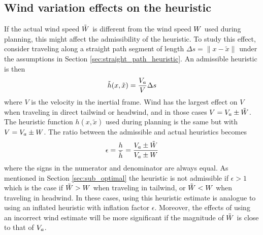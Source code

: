 \subsection{Wind variation effects on the heuristic}
If the actual wind speed $\tilde{W}$ is different from the wind speed $W$ used during planning, this 
might affect the admissibility of the heuristic. 
To study this effect, consider traveling along a straight path segment of length $\Delta s=\|x-\tilde{x}\|$ under the assumptions in Section \ref{sec:straight_path_heuristic}. 
An admissible heuristic is then 
\begin{equation}
    \tilde{h}(x, \tilde{x})=\frac{V_a}{V}\Delta s
\end{equation}
where $V$ is the velocity in the inertial frame. Wind has the largest effect on $V$ when traveling in direct tailwind or headwind, and in those cases $V=V_a\pm \tilde{W}$. The 
heuristic function $h(x, \tilde{x})$ used during planning is the same but with $V=V_a\pm W$. The ratio between the admissible and actual heuristics becomes
\begin{equation}\label{eq:wind_heuristic_eps}
    \epsilon = \frac{h}{\tilde{h}} = \frac{V_a \pm \tilde{W}}{V_a \pm W}
\end{equation}
where the signs in the numerator and denominator are always equal. As mentioned in Section \ref{sec:sub_optimal} the heuristic is not admissible if 
$\epsilon>1$ which is the case if $\tilde{W}>W$ when traveling in tailwind, or $\tilde{W}<W$ when traveling in headwind.
In these cases, using this heuristic estimate is analogue to using an inflated heuristic with inflation factor $\epsilon$. Moreover, the effects of using an incorrect wind estimate will be more significant if the 
magnitude of $\tilde{W}$ is close to that of $V_a$.